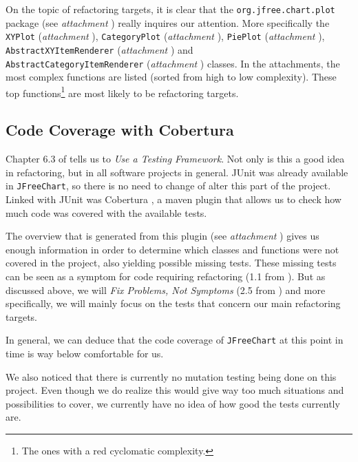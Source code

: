 \documentclass[11pt]{article}
\begin{document}
	On the topic of refactoring targets, it is clear that the \texttt{org.jfree.chart.plot} package (see \textsl{attachment \pageref{refactoring-package-plot}}) really inquires our attention. More specifically the \texttt{XYPlot} (\textsl{attachment \pageref{refactoring-XYPlot}}), \texttt{CategoryPlot} (\textsl{attachment \pageref{refactoring-CategoryPlot}}), \texttt{PiePlot} (\textsl{attachment \pageref{refactoring-PiePlot}}), \texttt{AbstractXYItemRenderer} (\textsl{attachment \pageref{refactoring-AbstractXYItemRenderer}}) and\\ \texttt{AbstractCategoryItemRenderer} (\textsl{attachment \pageref{refactoring-AbstractCategoryItemRenderer}}) classes. In the attachments, the most complex functions are listed (sorted from high to low complexity). These top functions\footnote{The ones with a red cyclomatic complexity.} are most likely to be refactoring targets.
	
	\subsection{Code Coverage with Cobertura}
	\label{sec:coco}
	Chapter 6.3 of \cite{demeyer2009object} tells us to \textsl{Use a Testing Framework}. Not only is this a good idea in refactoring, but in all software projects in general. JUnit was already available in \texttt{JFreeChart}, so there is no need to change of alter this part of the project. Linked with JUnit was \textsf{Cobertura} \cite{cobertura}, a maven plugin that allows us to check how much code was covered with the available tests.
	
	The overview that is generated from this plugin (see \textsl{attachment \pageref{cobertura-begin}}) gives us enough information in order to determine which classes and functions were not covered in the project, also yielding possible missing tests. These missing tests can be seen as a symptom for code requiring refactoring (1.1 from \cite{demeyer2009object}). But as discussed above, we will \textsl{Fix Problems, Not Symptoms} (2.5 from \cite{demeyer2009object}) and more specifically, we will mainly focus on the tests that concern our main refactoring targets.
	
	In general, we can deduce that the code coverage of \texttt{JFreeChart} at this point in time is way below comfortable for us.
	
	We also noticed that there is currently no mutation testing being done on this project. Even though we do realize this would give way too much situations and possibilities to cover, we currently have no idea of how good the tests currently are.
	
\end{document}
